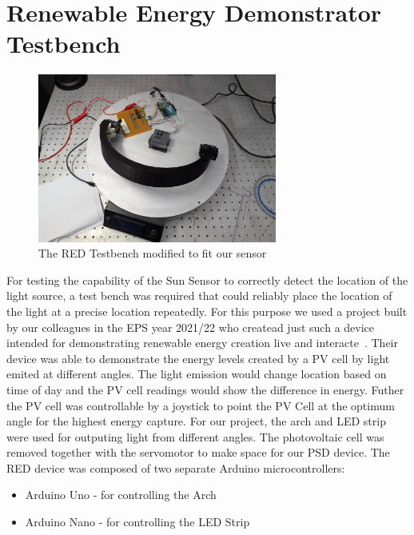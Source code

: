 \section{Renewable Energy Demonstrator Testbench}
\label{REDtestbench}

\begin{figure}[htbp]
    \centering
    \includegraphics[width=0.7\textwidth]{chapters/methodology/RED/RED_image.png}
    \caption{The RED Testbench modified to fit our sensor} 
    \label{fig:RED_testbench_flowchart}
\end{figure}

For testing the capability of the Sun Sensor to correctly detect the location of the light source, a test bench was required that could reliably place the location of the light at a precise location repeatedly. For this purpose we used a project built by our colleagues in the \acf{EPS} year 2021/22 who createad just such a device intended for demonstrating renewable energy creation live and interacte~\cite{RefWorks:shopov2022renewable}. Their device was able to demonstrate the energy levels created by a \ac{PV} cell by light emited at different angles. The light emission would change location based on time of day and the PV cell readings would show the difference in energy. Futher the PV cell was controllable by a joystick to point the PV Cell at the optimum angle for the highest energy capture. For our project, the arch and LED strip were used for outputing light from different angles. The photovoltaic cell was removed together with the servomotor to make space for our \ac{PSD} device.  The \ac{RED} device was composed of two separate Arduino microcontrollers:
\begin{itemize}
    \item Arduino Uno - for controlling the Arch 
    \item Arduino Nano - for controlling the LED Strip
\end{itemize}

